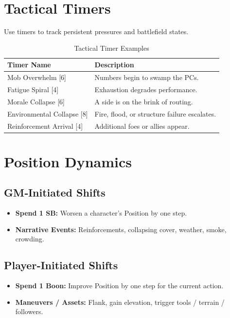 \section{Tactical Timers}\label{sec:tactical_timers}
Use timers to track persistent pressures and battlefield states.

\begin{longtable}{p{4cm} p{9cm}}
\caption{Tactical Timer Examples}\label{tab:tactical_timers}\\
\toprule
\textbf{Timer Name} & \textbf{Description} \\
\midrule
Mob Overwhelm [6] & Numbers begin to swamp the PCs. \\
Fatigue Spiral [4] & Exhaustion degrades performance. \\
Morale Collapse [6] & A side is on the brink of routing. \\
Environmental Collapse [8] & Fire, flood, or structure failure escalates. \\
Reinforcement Arrival [4] & Additional foes or allies appear. \\
\bottomrule
\end{longtable}

\section{Position Dynamics}\label{sec:position_dynamics}

\subsection{GM‑Initiated Shifts}\label{subsec:gm_shifts}
\begin{itemize}
    \item \textbf{Spend 1 SB:} Worsen a character's Position by one step.
    \item \textbf{Narrative Events:} Reinforcements, collapsing cover, weather, smoke, crowding.
\end{itemize}

\subsection{Player‑Initiated Shifts}\label{subsec:player_shifts}
\begin{itemize}
    \item \textbf{Spend 1 Boon:} Improve Position by one step for the current action.
    \item \textbf{Maneuvers / Assets:} Flank, gain elevation, trigger tools / terrain / followers.
\end{itemize}

